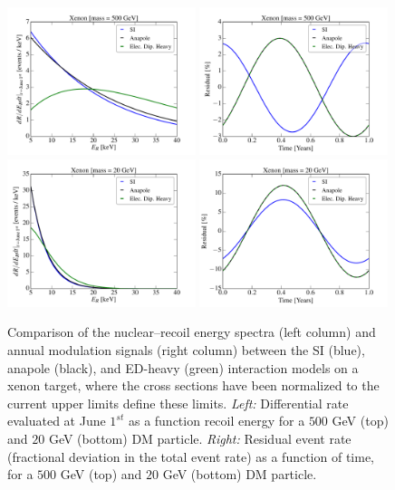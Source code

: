 \documentclass[11pt]{article}
\newcommand{\vgColor}{magenta}
\newcommand{\vg}[1]{{\color{\vgColor} #1}}
\begin{document}
\begin{figure}
\centering
\includegraphics[width=0.49\textwidth, trim=0.cm 0.0cm 0.cm 0.0cm,clip=true]{plots/RecoilComparison_500GeV.pdf}
\includegraphics[width=0.49\textwidth, trim=0.cm 0.0cm 0.cm 0.0cm,clip=true]{plots/Xenon_SIvsAnapole_500GeV_Residual_Theory.pdf}
\includegraphics[width=0.49\textwidth, trim=0.cm 0.0cm 0.cm 0.0cm,clip=true]{plots/RecoilComparison_20GeV.pdf}
\includegraphics[width=0.49\textwidth, trim=0.cm 0.0cm 0.cm 0.0cm,clip=true]{plots/Xenon_SIvsAnapole_20GeV_Residual_Theory.pdf}
\caption{\label{fig:diff_rate_comp}
Comparison of the nuclear--recoil energy spectra (left column) and annual modulation signals (right column) between the SI (blue), anapole (black), and ED-heavy (green) interaction models on a xenon target, where the cross sections have been normalized to the current upper limits \vg{define these limits}. \emph{Left:} Differential rate evaluated at June $1^{st}$ as a function recoil energy for a $500$ GeV (top) and $20$ GeV (bottom) DM particle. \emph{Right:} Residual event rate (fractional deviation in the total event rate) as a function of time, for a $500$ GeV (top) and $20$ GeV (bottom) DM particle. }
\end{figure}
\end{document}
